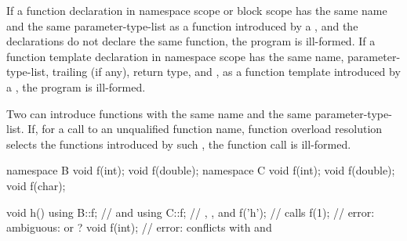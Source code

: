 \pnum
If a function declaration in namespace scope or block scope has the same
name and the same parameter-type-list as
a function introduced by a , and the
declarations do not declare the same function, the program is
ill-formed. If a function template declaration in namespace scope has
the same
name,
parameter-type-list,
trailing  (if any),
return type, and
,
as a function template introduced by a
, the program is ill-formed.
\begin{note}
Two  can introduce functions with the same
name and the same parameter-type-list. If, for a call to an unqualified
function name, function overload resolution selects the functions
introduced by such , the function call is
ill-formed.
\begin{example}
\begin{codeblock}
namespace B {
  void f(int);
  void f(double);
}
namespace C {
  void f(int);
  void f(double);
  void f(char);
}

void h() {
  using B::f;       //  and 
  using C::f;       // , , and 
  f('h');           // calls 
  f(1);             // error: ambiguous:  or ?
  void f(int);      // error:  conflicts with  and 
}
\end{codeblock}
\end{example}
\end{note}

